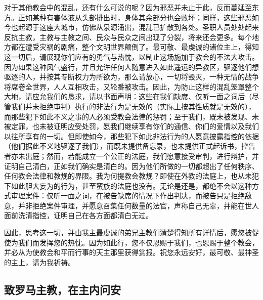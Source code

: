 对于其他教会中的混乱，还有什么可说的呢？因为邪恶并未止于此，反而蔓延至东方。正如某种有害体液从头部排出时，身体其余部分也会败坏；同样，这些邪恶如今也起源于这座大城市，仿佛从泉源涌出，混乱已扩散到各处。圣职人员处处起来反抗主教，主教与主教之间、民众与民众之间出现了分裂，将来还会更多。每个地方都在遭受灾祸的剧痛，整个文明世界颠倒了。最可敬、最虔诚的诸位主上，得知这一切后，请展现你们应有的勇气与热忱，以制止这场施加于教会的不法大攻击。因为如果这种风气盛行，并且允许任何人随意进入如此遥远的异教区，驱逐他们想驱逐的人，并按其专断权力为所欲为，那么请放心，一切将毁灭，一种无情的战争将席卷全世界，人人互相攻击，又轮番被攻击。因此，为防止这样的混乱笼罩整个大地，请应允我们的恳求，请以书面声明：这些在我们缺席、仅听一面之词后（尽管我们并未拒绝审判）执行的非法行为是无效的（实际上按其性质就是无效的），而那些犯下如此不义之事的人必须受教会法律的惩罚；至于我们，既未被发现、未被定罪，也未被证明应受处罚，愿我们继续享有你们的通信、你们的爱情以及我们以往所享有的一切。但即使如今，那些犯下如此非法行为的人愿意披露指控的依据（他们据此不义地驱逐了我们），而既未提供备忘录，也未提供正式起诉书，控告者亦未出庭；然而，若能成立一个公正的法庭，我们愿意接受审判，进行辩护，并证明自己清白，正如我们确实是清白的。因为他们所做的一切都超出了任何秩序、任何教会法律和教规的界限。我为何提教会教规？即使在外教的法庭上，也从未犯下如此胆大妄为的行为，甚至蛮族的法庭也没有。无论是还是，都绝不会以这种方式审理案件：仅听一面之词，在被告缺席的情况下作出判决，而被告只是拒绝敌意，并非拒绝案件审理，并愿意召集任何数量的法官，声称自己无辜，并能在世人面前洗清指控，证明自己在各方面都清白无过。\par

因此，思考这一切，并由我主最虔诚的弟兄主教们清楚得知所有详情后，愿您被促使为我们而发挥您的热忱。因为如此行，您不仅恩赐于我们，也恩赐于整个教会，并必从为使教会和平而行事的天主那里获得赏报。祝您永远安好，最可敬、最神圣的主上，请为我祈祷。\par


\subsection{致罗马主教，在主内问安}

